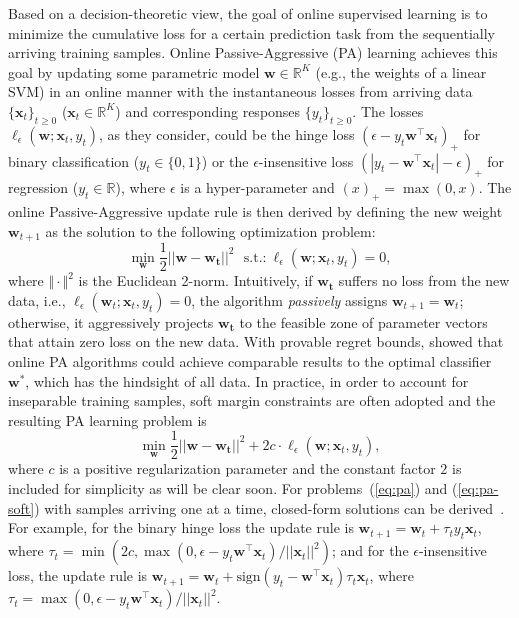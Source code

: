 \documentclass[twoside,11pt]{article}
\newcommand{\xv}{\bm{x}}
\newcommand{\wv}{\bm{w}}
\newcommand{\real}{\mathbb{R}}
\begin{document}
Based on a decision-theoretic view, the goal of online supervised learning is to minimize the cumulative loss for a certain prediction task from the sequentially arriving training samples. Online Passive-Aggressive (PA) learning \citep{crammer2006pa} achieves this goal by updating some parametric model $\bm{w} \in \real^K$ (e.g., the weights of a linear SVM) in an online manner with the instantaneous losses from arriving data $\{\bm{x}_t\}_{t \geq 0}$ ($\xv_t \in \real^K$) and corresponding responses $\{y_t\}_{t \geq 0}$. The losses $\ell_\epsilon(\bm{w}; \bm{x}_t, y_t)$, as they consider, could be the hinge loss $(\epsilon-y_t \wv^\top \xv_t)_+$ for binary classification ($y_t \in \{0,1\}$) or the $\epsilon$-insensitive loss $(|y_t- \wv^\top \xv_t|-\epsilon)_+$ for regression ($y_t \in \mathbb{R}$), where $\epsilon$ is a hyper-parameter and $(x)_+ = \max(0,x)$. The online Passive-Aggressive update rule is then derived by defining the new weight $\bm{w}_{t+1}$ as the solution to the following optimization problem:
\begin{equation}\label{eq:pa}
\min_{\bm{w}}{\frac{1}{2} ||\bm{w}-\bm{w_{t}}||^2} ~~~ \text{s.t.:} ~ \ell_{\epsilon}(\bm{w}; \bm{x}_t, y_t) = 0,
\end{equation}
where $\Vert \cdot \Vert^2$ is the Euclidean 2-norm. Intuitively, if $\bm{w_t}$ suffers no loss from the new data, i.e., $\ell_{\epsilon}(\bm{w}_t; \bm{x}_t, y_t) = 0$, the algorithm \emph{passively} assigns $\bm{w}_{t+1} = \bm{w}_t$; otherwise, it aggressively projects $\bm{w_t}$ to the feasible zone of parameter vectors that attain zero loss on the new data. With provable regret bounds, \cite{crammer2006pa} showed that online PA algorithms could achieve comparable results to the optimal classifier $\bm{w}^*$, which has the hindsight of all data. In practice, in order to account for inseparable training samples, soft margin constraints are often adopted and the resulting PA learning problem is
\begin{equation}\label{eq:pa-soft}
\min_{\bm{w}}{\frac{1}{2} ||\bm{w}-\bm{w_{t}}||^2} + 2 c \cdot \ell_{\epsilon}(\bm{w}; \bm{x}_t, y_t),
\end{equation}
where $c$ is a positive regularization parameter and the constant factor $2$ is included for simplicity as will be clear soon. For problems~(\ref{eq:pa}) and (\ref{eq:pa-soft}) with samples arriving one at a time, closed-form solutions can be derived~\citep{crammer2006pa}. For example, for the binary hinge loss the update rule is $\wv_{t+1} = \wv_t + \tau_t y_t \xv_t$, where $\tau_t = \min(2c, \max(0,\epsilon-y_t \wv^\top \xv_t)/||\xv_t||^2)$; and for the $\epsilon$-insensitive loss, the update rule is $\wv_{t+1} = \wv_t+\text{sign}(y_t-\wv^\top \xv_t) \tau_t \xv_t$, where $\tau_t = \max(0,\epsilon-y_t \wv^\top \xv_t)/||\xv_t||^2$.
\end{document}
